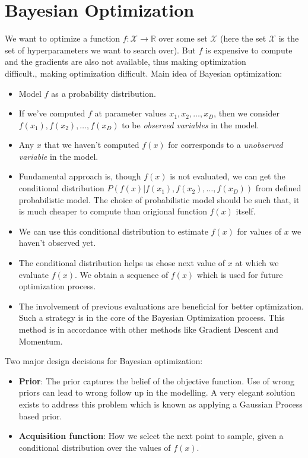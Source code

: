 \section{Bayesian Optimization}\label{sec:bo}
We want to optimize a function $f : \mathcal{X} \to \mathbb{R}$ over some set $\mathcal{X}$ (here the set $\mathcal{X}$ is the set of hyperparameters we want to search over). But $f$ is expensive to compute and the gradients are also not available, thus making optimization difficult.,\textcolor{white}{"}making optimization difficult\cite{cs4787}. Main idea of Bayesian optimization:\textcolor{white}{"}
\begin{itemize}
	\item Model $f$ as\textcolor{white}{"}a probability distribution.\textcolor{white}{"}
	\item If we’ve computed $f$ at parameter values $x_1, x_2, \dots , x_D$, then we consider\\ $f (x_1), f(x_2), \dots , f(x_D)$ to be \textit{observed variables} in the model.
	\item Any $x$ that we haven’t computed $f(x)$ for corresponds to a \textit{unobserved variable} in the model.
	\item Fundamental approach is, though $f(x)$ is not evaluated, we can get the conditional distribution  $ P(f(x)|f(x_1), f(x_2), \dots , f(x_D))$ from defined probabilistic model. The choice of probabilistic model should be such that, it is much cheaper to compute than origional function $f(x)$ itself.
	\item We\textcolor{white}{"}can use this conditional distribution to estimate $f(x)$ for values of $x$ we haven’t observed yet.\textcolor{white}{"}
	\item The conditional distribution helps us chose next value of $x$ at which we evaluate $f(x)$. We obtain a sequence of $f(x)$ which is used for future optimization process.
	\item The involvement of previous evaluations are beneficial for better optimization. Such a strategy is in the core of the Bayesian Optimization process. This method is in accordance with other methods like Gradient Descent and Momentum.
\end{itemize}
Two major design decisions for Bayesian optimization:
\begin{itemize}
	\item \textbf{Prior}: The prior captures the belief of the objective function. Use of wrong priors can lead to wrong follow up in the modelling. A very elegant solution exists to address this problem which is known as applying a Gaussian Process based prior.
	\item \textbf{Acquisition function}: How\textcolor{white}{"}we select the next point to sample, given a conditional distribution over the values of $f(x)$.\textcolor{white}{"} 
\end{itemize}

